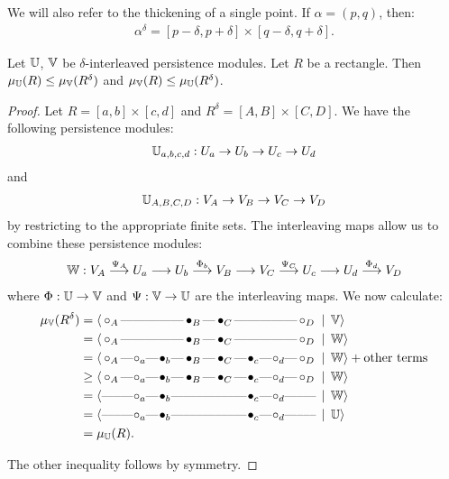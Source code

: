 We will also refer to the thickening of a single point. If $\alpha = (p, q)$, then:
\begin{align*}
  \alpha^\delta = [p - \delta, p + \delta] \times [q - \delta, q + \delta].
\end{align*}

\begin{lemma}
Let $\mathbb{U}$, $\mathbb{V}$ be $\delta$-interleaved persistence modules. Let $R$ be a rectangle. Then $\mu_{\mathbb{U}}(R) \leq \mu_{\mathbb{V}}(R^\delta)$ and $\mu_{\mathbb{V}}(R) \leq \mu_{\mathbb{U}}(R^\delta)$.
\end{lemma}
\begin{proof}
Let $R = [a, b] \times [c, d]$ and $R^\delta = [A, B] \times [C, D]$. We have the following persistence modules:
\begin{align*}
  \mathbb{U}_{a,b,c,d} : U_a \to U_b \to U_c \to U_d
\end{align*}
and
\begin{align*}
  \mathbb{U}_{A,B,C,D} : V_A \to V_B \to V_C \to V_D
\end{align*}
by restricting to the appropriate finite sets. The interleaving maps allow us to combine these persistence modules:
\begin{align*}
  \mathbb{W} : V_A \overset{\Psi_A}{\longrightarrow} U_a \longrightarrow U_b \overset{\Phi_b}{\longrightarrow} V_B \longrightarrow V_C \overset{\Psi_C}{\longrightarrow} U_c \longrightarrow U_d \overset{\Phi_d}{\longrightarrow} V_D
\end{align*}
where $\Phi : \mathbb{U} \to \mathbb{V}$ and $\Psi : \mathbb{V} \to \mathbb{U}$ are the interleaving maps. We now calculate:
\begin{align*}
\mu_\V(R^\delta) &= \langle \Qoff{A} \qem \qno \qem \qno \qem \Qon{B} \qem \Qon{C} \qem \qno \qem \qno \qem \Qoff{D} \st \V \rangle \\
&= \langle \Qoff{A} \qem \qno \qem \qno \qem \Qon{B} \qem \Qon{C} \qem \qno \qem \qno \qem \Qoff{D} \st \W \rangle \\
&= \langle \Qoff{A} \qem \qoff{a} \qem \qon{b} \qem \Qon{B} \qem \Qon{C} \qem \qon{c} \qem \qoff{d} \qem \Qoff{D} \st \W \rangle + \text{other terms}\\
&\geq \langle \Qoff{A} \qem \qoff{a} \qem \qon{b} \qem \Qon{B} \qem \Qon{C} \qem \qon{c} \qem \qoff{d} \qem \Qoff{D} \st \W \rangle \\
&= \langle \Qno \qem \qoff{a} \qem \qon{b} \qem \Qno \qem \Qno \qem \qon{c} \qem \qoff{d} \qem \Qno \st \W \rangle \\
&= \langle \Qno \qem \qoff{a} \qem \qon{b} \qem \Qno \qem \Qno \qem \qon{c} \qem \qoff{d} \qem \Qno \st \U \rangle \\
&= \mu_\U(R).
\end{align*}

The other inequality follows by symmetry.
\end{proof}


